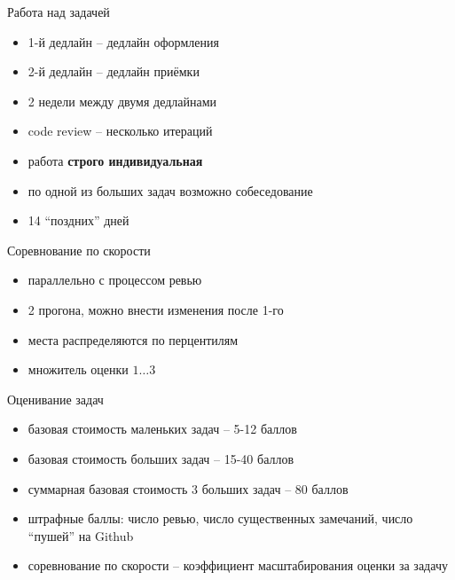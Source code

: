 \documentclass[unknownkeysallowed,xcolor=table]{beamer}
\begin{document}
\begin{frame}{Работа над задачей}
  \begin{itemize}
    \item 1-й дедлайн -- дедлайн оформления \vspace{1em}
    \item 2-й дедлайн -- дедлайн приёмки \vspace{1em}
    \item 2 недели между двумя дедлайнами \vspace{1em}
    \item code review -- несколько итераций \vspace{1em}
    \item работа \textbf{строго индивидуальная} \vspace{1em}
    \item по одной из больших задач возможно собеседование \vspace{1em}
    \item 14 ``поздних'' дней
  \end{itemize}
\end{frame}

\begin{frame}{Соревнование по скорости}
  \begin{itemize}
    \item параллельно с процессом ревью \vspace{1em}
    \item 2 прогона, можно внести изменения после 1-го \vspace{1em}
    \item места распределяются по перцентилям \vspace{1em}
    \item множитель оценки $1 \dotso 3$
  \end{itemize}
\end{frame}

\begin{frame}{Оценивание задач}
  \begin{itemize}
    \item базовая стоимость маленьких задач -- 5-12 баллов \vspace{1em}
    \item базовая стоимость больших задач -- 15-40 баллов \vspace{1em}
    \item суммарная базовая стоимость 3 больших задач -- 80 баллов \vspace{1em}
    \item штрафные баллы: число ревью, число существенных замечаний, число ``пушей'' на Github \vspace{1em}
    \item соревнование по скорости -- коэффициент масштабирования оценки за задачу
  \end{itemize}
\end{frame}
\end{document}

